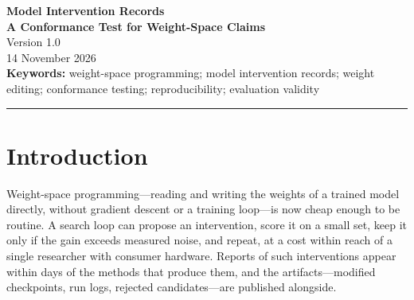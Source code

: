\documentclass[11pt]{article}
\begin{document}
\thispagestyle{plain}
\begin{center}
\vspace*{0.4em}
{\LARGE\bfseries Model Intervention Records}\\[0.35em]
{\LARGE\bfseries A Conformance Test for Weight-Space Claims}\\[0.8em]
{\large Version 1.0}\\[0.25em]
{\large 14 November 2026}\\[0.8em]
{\small\textbf{Keywords:} weight-space programming; model intervention records;
weight editing; conformance testing; reproducibility; evaluation validity}
\end{center}
\vspace{0.2em}
\hrule
\vspace{0.6em}

\begin{abstract}
Claims that an intervention changes a language model's behavior are currently
not comparable. The interventions at issue are the ones now described as
weight-space programming: a model's weights read and edited directly, without
gradient descent or a training loop. Two reports of the same intervention can
both be accurate and still disagree about what happened, because neither record
states what was required not to change. We specify a record format with three
mandatory components: an executable falsifier; an invariant set containing at
least one metric outside the claim's own declared scoring function; and
content-addressed lineage to a base checkpoint. We then specify a mechanical
test that checks them, and we apply it to a published intervention: the record
satisfies ten of eleven checks and fails the one on cost disclosure. The test
emits no aggregate score and does not assess importance, safety, or desirability.
We release two dependency-free implementations, written from the same text in
different languages, and they agree on every input in the repository. Adoption
requires no authority: conformance is a claim that anyone may check.
\end{abstract}

\section{Introduction}

Weight-space programming---reading and writing the weights of a trained model
directly, without gradient descent or a training loop---is now cheap enough to
be routine. A search loop can propose an intervention, score it on a small set,
keep it only if the gain exceeds measured noise, and repeat, at a cost within
reach of a single researcher with consumer hardware. Reports of such
interventions appear within days of the methods that produce them, and the
artifacts---modified checkpoints, run logs, rejected candidates---are published
alongside.
\end{document}
